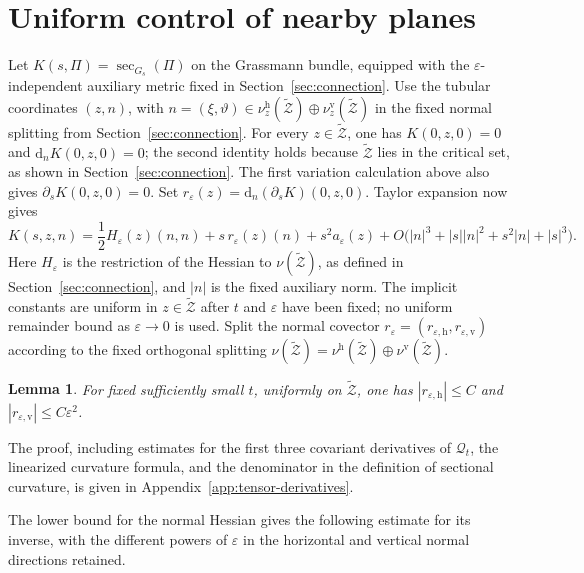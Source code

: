 \documentclass[11pt]{article}
\newtheorem{lemma}[theorem]{Lemma}
\theoremstyle{definition}
\theoremstyle{remark}
\newcommand{\tZ}{\widetilde{\mathcal Z}}
\newcommand{\dd}{\mathrm d}
\newcommand{\eps}{\varepsilon}
\begin{document}
\section{Uniform control of nearby planes}                                         \label{sec:nearby-planes}

Let $K(s,\Pi)=\sec_{G_s}(\Pi)$ on the Grassmann bundle, equipped with
the $\eps$-independent auxiliary metric fixed in
Section~\ref{sec:connection}.  Use the tubular coordinates
$(z,n)$, with
$n=(\xi,\vartheta)\in\nu^{\mathrm h}_z(\tZ)\oplus
\nu^{\mathrm v}_z(\tZ)$ in the fixed normal splitting from
Section~\ref{sec:connection}.  For every $z\in\tZ$, one has
$K(0,z,0)=0$ and $\dd_n K(0,z,0)=0$; the second identity holds because
$\tZ$ lies in the critical set, as shown in Section~\ref{sec:connection}.
The first variation calculation above also gives
$\partial_s K(0,z,0)=0$.  Set
$r_\eps(z)=\dd_n(\partial_s K)(0,z,0)$.  Taylor expansion now gives
\begin{equation}                                                                    \label{eq:tubular-expansion}
 K(s,z,n)
 = \frac12H_\eps(z)(n,n)
 +s\,r_\eps(z)(n)
 +s^2a_\eps(z) + O\bigl(|n|^3+|s||n|^2+s^2|n|+|s|^3\bigr).
\end{equation}
Here $H_\eps$ is the restriction of the Hessian to $\nu(\tZ)$, as defined in
Section~\ref{sec:connection}, and $|n|$ is the fixed auxiliary norm.  The
implicit constants are uniform in $z\in\tZ$ after $t$ and $\eps$ have been
fixed; no uniform remainder bound as $\eps\to0$ is used.  Split the normal
covector
$r_\eps=(r_{\eps,\mathrm h},r_{\eps,\mathrm v})$ according to the fixed orthogonal splitting
$\nu(\tZ)=\nu^{\mathrm h}(\tZ)\oplus\nu^{\mathrm v}(\tZ)$.

\begin{lemma}                                                                       \label{lem:first-variation-estimate}
For fixed sufficiently small $t$, uniformly on $\tZ$, one has
$|r_{\eps,\mathrm h}|\leq C$ and $|r_{\eps,\mathrm v}|\leq C\eps^2$.
\end{lemma}

The proof, including estimates for the first three covariant derivatives of
$\mathcal Q_t$, the linearized curvature formula, and the denominator in the
definition of sectional curvature, is given in
Appendix~\ref{app:tensor-derivatives}.

The lower bound for the normal Hessian gives the following estimate for its
inverse, with the different powers of $\eps$ in the horizontal and vertical
normal directions retained.
\end{document}
